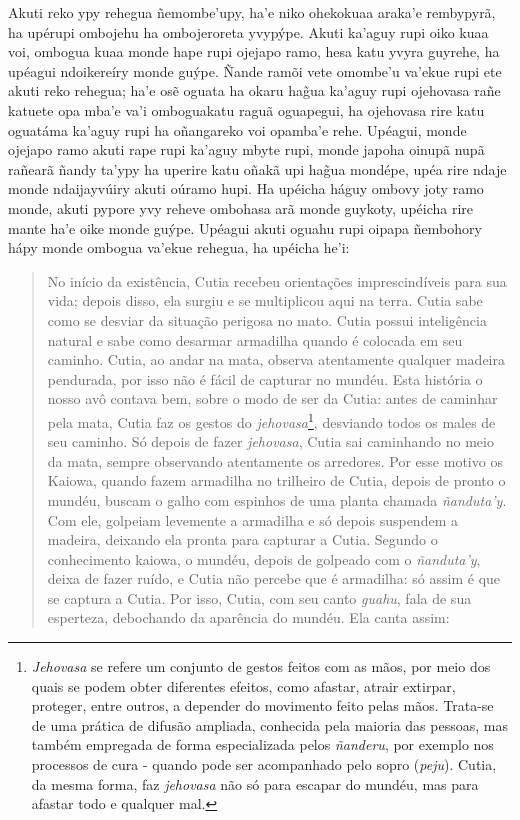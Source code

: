 Akuti reko ypy rehegua ñemombe'upy, ha'e niko ohekokuaa araka'e
rembypyrã, ha upérupi ombojehu ha ombojeroreta yvypýpe. Akuti ka'aguy
rupi oiko kuaa voi, ombogua kuaa monde hape rupi ojejapo ramo, hesa katu
yvyra guyrehe, ha upéagui ndoikereíry monde guýpe. Ñande ramõi vete
omombe'u va'ekue rupi ete akuti reko rehegua; ha'e osẽ oguata ha okaru
hag̃ua ka'aguy rupi ojehovasa rañe katuete opa mba'e va'i omboguakatu
raguã oguapegui, ha ojehovasa rire katu oguatáma ka'aguy rupi ha
oñangareko voi opamba'e rehe. Upéagui, monde ojejapo ramo akuti rape
rupi ka'aguy mbyte rupi, monde japoha oinupã nupã rañearã ñandy ta'ypy
ha uperire katu oñakã upi hag̃ua mondépe, upéa rire ndaje monde
ndaijayvúiry akuti oúramo hupi. Ha upéicha háguy ombovy joty ramo monde,
akuti pypore yvy reheve ombohasa arã monde guykoty, upéicha rire mante
ha'e oike monde guýpe. Upéagui akuti oguahu rupi oipapa ñembohory hápy
monde ombogua va'ekue rehegua, ha upéicha he'i:

\begin{quote}
No início da existência, Cutia recebeu orientações imprescindíveis para
sua vida; depois disso, ela surgiu e se multiplicou aqui na terra. Cutia
sabe como se desviar da situação perigosa no mato. Cutia possui
inteligência natural e sabe como desarmar armadilha quando é colocada em
seu caminho. Cutia, ao andar na mata, observa atentamente qualquer
madeira pendurada, por isso não é fácil de capturar no mundéu. Esta
história o nosso avô contava bem, sobre o modo de ser da Cutia: antes de
caminhar pela mata, Cutia faz os gestos do \emph{jehovasa}\footnote{\emph{Jehovasa}
  se refere um conjunto de gestos feitos com as mãos, por meio dos quais
  se podem obter diferentes efeitos, como afastar, atrair extirpar,
  proteger, entre outros, a depender do movimento feito pelas mãos.
  Trata-se de uma prática de difusão ampliada, conhecida pela maioria
  das pessoas, mas também empregada de forma especializada pelos
  \emph{ñanderu}, por exemplo nos processos de cura - quando pode ser
  acompanhado pelo sopro (\emph{peju}). Cutia, da mesma forma, faz
  \emph{jehovasa} não só para escapar do mundéu, mas para afastar todo e
  qualquer mal.}, desviando todos os males de seu caminho. Só depois de
fazer \emph{jehovasa}, Cutia sai caminhando no meio da mata, sempre
observando atentamente os arredores. Por esse motivo os Kaiowa, quando
fazem armadilha no trilheiro de Cutia, depois de pronto o mundéu, buscam
o galho com espinhos de uma planta chamada \emph{ñanduta'y}. Com ele,
golpeiam levemente a armadilha e só depois suspendem a madeira, deixando
ela pronta para capturar a Cutia. Segundo o conhecimento kaiowa, o
mundéu, depois de golpeado com o \emph{ñanduta'y}, deixa de fazer ruído,
e Cutia não percebe que é armadilha: só assim é que se captura a Cutia.
Por isso, Cutia, com seu canto \emph{guahu}, fala de sua esperteza,
debochando da aparência do mundéu. Ela canta assim:
\end{quote}


